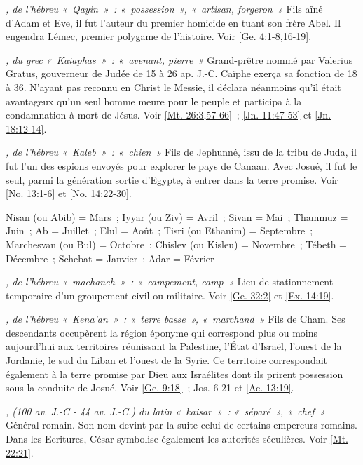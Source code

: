 \begin{multicols}{2}
\textit{, de l'hébreu «~Qayin~»~: «~possession~», «~artisan, forgeron~»}\newline
Fils aîné d'Adam et Eve, il fut l'auteur du premier homicide en tuant son frère Abel. Il engendra Lémec, premier polygame de l'histoire. Voir \vref{Ge. 4:1-8,16-19}.

\textit{, du grec «~Kaiaphas~»~: «~avenant, pierre~»}\newline
Grand-prêtre nommé par Valerius Gratus, gouverneur de Judée de 15 à 26 ap. J.-C. Caïphe exerça sa fonction de 18 à 36. N'ayant pas reconnu en Christ le Messie, il déclara néanmoins qu'il était avantageux qu'un seul homme meure pour le peuple et participa à la condamnation à mort de Jésus. Voir \vref{Mt. 26:3,57-66}~; \vref{Jn. 11:47-53} et \vref{Jn. 18:12-14}.

\textit{, de l'hébreu «~Kaleb~»~: «~chien~»}\newline
Fils de Jephunné, issu de la tribu de Juda, il fut l'un des espions envoyés pour explorer le pays de Canaan. Avec Josué, il fut le seul, parmi la génération sortie d'Egypte, à entrer dans la terre promise. Voir \vref{No. 13:1-6} et \vref{No. 14:22-30}.

\textit{}\newline
Nisan (ou Abib) = Mars~; Iyyar (ou Ziv) = Avril~; Sivan = Mai~; Thammuz = Juin~; Ab = Juillet~; Elul = Août~; Tisri (ou Ethanim) = Septembre~; Marchesvan (ou Bul) = Octobre~; Chislev (ou Kisleu) = Novembre~; Tébeth = Décembre~; Schebat = Janvier~; Adar = Février

\textit{, de l'hébreu «~machaneh~»~: «~campement, camp~»}\newline
Lieu de stationnement temporaire d'un groupement civil ou militaire. Voir \vref{Ge. 32:2} et \vref{Ex. 14:19}.

\textit{, de l'hébreu «~Kena'an~»~: «~terre basse~», «~marchand~»}\newline
Fils de Cham. Ses descendants occupèrent la région éponyme qui correspond plus ou moins aujourd'hui aux territoires réunissant la Palestine, l'État d'Israël, l'ouest de la Jordanie, le sud du Liban et l'ouest de la Syrie. Ce territoire correspondait également à la terre promise par Dieu aux Israélites dont ils prirent possession sous la conduite de Josué. Voir \vref{Ge. 9:18}~; Jos. 6-21 et \vref{Ac. 13:19}.

\textit{, (100 av. J.-C - 44 av. J.-C.) du latin «~kaisar~»~: «~séparé~», «~chef~»}\newline
Général romain. Son nom devint par la suite celui de certains empereurs romains. Dans les Ecritures, César symbolise également les autorités séculières. Voir \vref{Mt. 22:21}.


\end{multicols}
